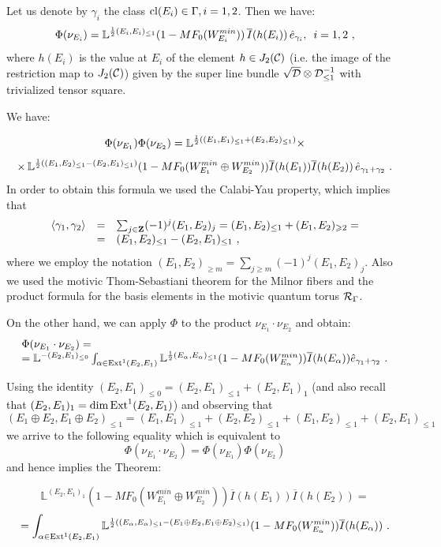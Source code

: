 \documentclass[12pt]{article}
\begin{document}
Let us denote by $\gamma_i$ the class $\operatorname{cl}(E_i)\in \Gamma, i=1,2$. Then we have:
$$\Phi(\nu_{E_i})={\mathbb L}^{{1\over{2}}(E_i,E_i)_{\le 1}}(1-MF_0(W_{E_i}^{min}))\,\overline{I}(h(E_i))\,\hat{e}_{\gamma_i},\,\,\, i=1,2\,\,,$$
where $h(E_i)$ is the value at $E_i$ of the element $h\in J_2({\mathcal C})$ (i.e. the image of the restriction map to $J_2({\mathcal C})$) given by the super line bundle $\sqrt{{\cal D}}\otimes {\cal D}_{\le 1}^{-1}$ with trivialized tensor square.

We have:

$$\Phi(\nu_{E_1})\Phi(\nu_{E_2})={\mathbb L}^{{1\over{2}}((E_1,E_1)_{\le 1}+(E_2,E_2)_{\le 1})}\times$$
$$\times\,{\mathbb L}^{{1\over{2}}((E_1,E_2)_{\le 1}-(E_2,E_1)_{\le 1})}(1-MF_0(W_{E_1}^{min}\oplus W_{E_2}^{min}))\overline{I}(h(E_1))\overline{I}(h(E_2))\,\hat{e}_{\gamma_1+\gamma_2}\,\,.$$
In order to obtain this formula  we used the Calabi-Yau property, which implies that
$$\begin{array}{rcl}
\langle \gamma_1,\gamma_2\rangle&=&\sum_{j\in {\bf Z}}(-1)^j(E_1,E_2)_j=(E_1,E_2)_{\le 1}+(E_1,E_2)_{\geqslant 2}=\\
&=&(E_1,E_2)_{\le 1}-(E_2,E_1)_{\le 1}\,\,,
\end{array}$$
where we employ the notation $(E_1,E_2)_{\geqslant m}=\sum_{j\geqslant m}(-1)^j(E_1,E_2)_j$.
Also we used the motivic Thom-Sebastiani theorem for the Milnor fibers and the product formula for the basis elements in the motivic quantum torus ${\cal R}_{\Gamma}$.

On the other hand, we can apply $\Phi$ to the product $\nu_{E_1}\cdot \nu_{E_2}$ and obtain:
$$\begin{array}{l}
\Phi(\nu_{E_1}\cdot \nu_{E_2})=\\
={\mathbb L}^{-(E_2,E_1)_{\le 0}}\int_{\alpha\in
\operatorname{Ext}^1(E_2,E_1)}{\mathbb L}^{{1\over{2}}(E_{\alpha},E_{\alpha})_{\le
1}}(1-MF_0(W_{E_{\alpha}}^{min}))\overline{I}(h(E_{\alpha}))\hat{e}_{\gamma_1+\gamma_2}\,\,.
\end{array}$$


Using the identity $(E_2,E_1)_{\le 0}=(E_2,E_1)_{\le 1}+(E_2,E_1)_1$ (and also recall that $(E_2,E_1)_1=\dim \operatorname{Ext}^1(E_2,E_1)$) and observing that
$$(E_1\oplus E_2,E_1\oplus E_2)_{\le 1}=(E_1,E_1)_{\le 1}+(E_2,E_2)_{\le 1}+(E_1,E_2)_{\le 1}+(E_2,E_1)_{\le 1}$$
we arrive to the following equality which is equivalent to 
$$\Phi(\nu_{E_1}\cdot \nu_{E_2})=\Phi(\nu_{E_1})\Phi(\nu_{E_2})$$ and hence implies the Theorem:

$${\mathbb L}^{(E_2,E_1)_1}(1-MF_0(W_{E_1}^{min}\oplus W_{E_2}^{min}))\overline{I}(h(E_1))\overline{I}(h(E_2))=$$
$$=\int_{\alpha\in \operatorname{Ext}^1(E_2,E_1)}{\mathbb L}^{{1\over{2}}((E_{\alpha},E_{\alpha})_{\le
1}-(E_1\oplus E_2,E_1\oplus E_2)_{\le 1})}(1-MF_0(W_{E_{\alpha}}^{min}))\overline{I}(h(E_{\alpha}))\,\,.$$
\end{document}
